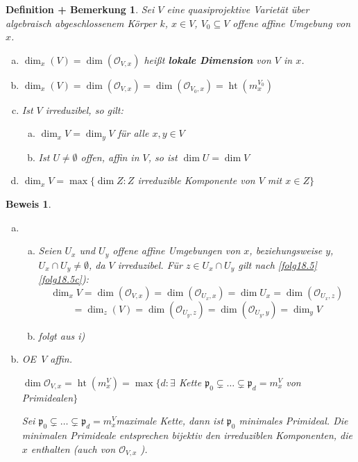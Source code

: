 \documentclass[a4paper, 12pt, numbers=noendperiod, chapterprefix=true]{scrbook}
\theoremstyle{break}
\newtheorem{DefBem}[Def]{Definition + Bemerkung}
\theoremstyle{nonumberbreak}
\newtheorem{Bew}{Beweis}
\theoremstyle{nonumberplain}
\newcommand{\emp}[1]{\textbf{\emph{#1}}}
\newcommand{\deftermspec}[2]{{\index{#2}}\emp{#1}}
\DeclareMathOperator{\Ht}{ht}
\newcommand{\calO}{\mathcal{O}}
\renewcommand{\OE}{O\!\!E~}
\begin{document}
\begin{DefBem}\label{18.6}
Sei $V$ eine quasiprojektive Variet\"at \"uber algebraisch abgeschlossenem K\"orper $k$, $x\in V$, $V_0\subseteq V$ offene affine Umgebung von $x$.\begin{enumerate}[a)]
\item
	$\dim_x(V)=\dim(\calO_{V,x})$ hei\ss t \deftermspec{lokale Dimension}{Dimension!lokale-} von $V$ in $x$.
\item
	$\dim_x(V)=\dim(\calO_{V,x})=\dim(\calO_{V_0,x})=\Ht(m_x^{V_0})$
\item
	Ist $V$ irreduzibel, so gilt:\begin{enumerate}[a)]
	\item[i)]
		$\dim_xV=\dim_yV$ f\"ur alle $x,y\in V$
	\item[ii)]
		Ist $U\ne\emptyset$ offen, affin in $V$, so ist $\dim U=\dim V$
	\end{enumerate}
\item
	$\dim_xV=\max\{\dim Z: Z$ irreduzible Komponente von $V$ mit $x\in Z\}$
\end{enumerate}\end{DefBem}

\begin{Bew}\begin{enumerate}[a)]
\item[c)]\begin{enumerate}[a)]
	\item[i)]
		Seien $U_x$ und $U_y$ offene affine Umgebungen von $x$, beziehungsweise $y$, $U_x\cap U_y\ne\emptyset$, da $V$ irreduzibel. F\"ur $z\in U_x\cap U_y$ gilt nach \ref{folg18.5} \ref{folg18.5c}):
			\[\dim_xV=\dim(\calO_{V,x})=\dim(\calO_{U_x,x})=\dim U_x=\dim(\calO_{U_x,z})\]
			\[=\dim_z(V)=\dim(\calO_{U_y,z})=\dim(\calO_{U_y,y})=\dim_y V\]
	\item[ii)]
		folgt aus i)\end{enumerate}
\item[d)]
	\OE $V$ affin.
	
	$\dim\calO_{V,x}=\Ht(m_x^V)=\max\{d:\exists$ Kette $\mathfrak p_0 \subsetneq\ldots \subsetneq\mathfrak p_d=m_x^V$ von Primidealen$\}$
	
	Sei $\mathfrak p_0 \subsetneq\ldots \subsetneq\mathfrak p_d=m_x^V$maximale Kette, dann ist $\mathfrak p_0$ minimales Primideal. Die minimalen Primideale entsprechen bijektiv den irreduziblen Komponenten, die $x$ enthalten (auch von $\calO_{V,x}$ ).
\end{enumerate}\end{Bew}
\end{document}
